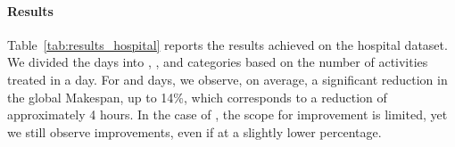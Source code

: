 \paragraph{Results}
Table~\ref{tab:results_hospital} reports the results achieved on the hospital dataset. We divided the days into , , and  categories based on the number of activities treated in a day. For  and  days, we observe, on average, a significant reduction in the global Makespan, up to 14\%, which corresponds to a reduction of approximately 4 hours. In the case of , the scope for improvement is limited, yet we still observe improvements, even if at a slightly lower percentage. 




\begin{table}[tb]
    \centering
    \caption{The NPM metrics are presented for each size, with and without the resource calendars.}
\label{tab:results_synthetic}
\end{table}


\begin{table}[tb]
    \centering
    \caption{The days are divided into 3 groups based on 33rd and 67th percentiles.}
\label{tab:results_hospital}
\end{table}


